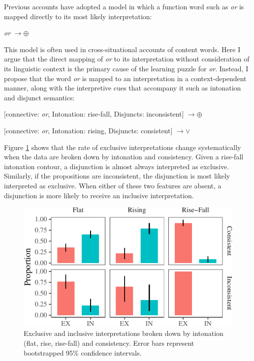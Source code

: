 \documentclass[floatsintext,man]{apa6}
\theoremstyle{definition}
\theoremstyle{definition}
\theoremstyle{definition}
\theoremstyle{remark}
\begin{document}
Previous accounts have adopted a model in which a function word such as
\emph{or} is mapped directly to its most likely interpretation:

\emph{or} \(\rightarrow \oplus\)

This model is often used in cross-situational accounts of content words.
Here I argue that the direct mapping of \emph{or} to its interpretation
without consideration of its linguistic context is the primary cause of
the learning puzzle for \emph{or}. Instead, I propose that the word
\emph{or} is mapped to an interpretation in a context-dependent manner,
along with the interpretive cues that accompany it such as intonation
and disjunct semantics:

{[}connective: \emph{or}, Intonation: rise-fall, Disjuncts:
inconsistent{]} \(\rightarrow \oplus\)

{[}connective: \emph{or}, Intonation: rising, Disjuncts: consistent{]}
\(\rightarrow \lor\)

Figure \ref{fig:interpretationByIntonationAndConsistency} shows that the
rate of exclusive interpretations change systematically when the data
are broken down by intonation and consistency. Given a rise-fall
intonation contour, a disjunction is almost always interpreted as
exclusive. Similarly, if the propositions are inconsistent, the
disjunction is most likely interpreted as exclusive. When either of
these two features are absent, a disjunction is more likely to receive
an inclusive interpretation.

\begin{figure}[tb]

{\centering \includegraphics{figs/interpretationByIntonationAndConsistency-1} 

}

\caption{Exclusive and inclusive interpretations broken down by intonation (flat, rise, rise-fall) and consistency. Error bars represent bootstrapped 95\% confidence intervals.}\label{fig:interpretationByIntonationAndConsistency}
\end{figure}
\end{document}
